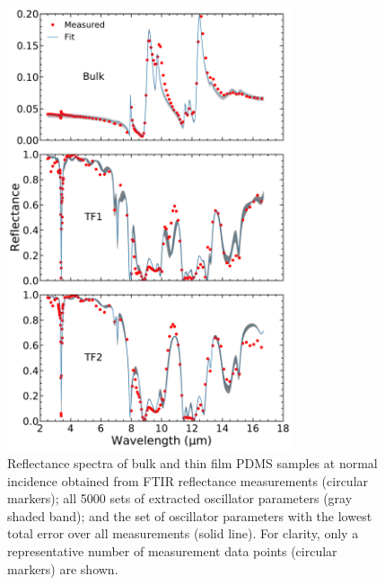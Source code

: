 \begin{figure}
\centering
\includegraphics[width=0.75\textwidth]{./Figures/PDMS_Reflectance_and_Fit.pdf}
\caption{\label{fig:RelectanceError} Reflectance spectra of bulk and thin film PDMS samples at normal incidence obtained from FTIR reflectance measurements (circular markers); all 5000 sets of extracted oscillator parameters (gray shaded band); and the set of oscillator parameters with the lowest total error over all measurements (solid line). For clarity, only a representative number of measurement data points (circular markers) are shown.}
\end{figure}






